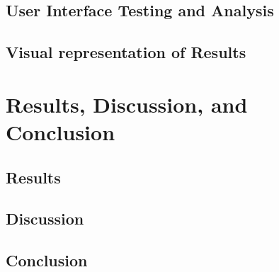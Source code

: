 \documentclass[doc,apacite,12pt]{apa6}
\begin{document}
\clearpage

\subsection{User Interface Testing and Analysis}


\subsection{Visual representation of Results}


\clearpage

\section{Results, Discussion, and Conclusion}

\subsection{Results}


\subsection{Discussion}


\subsection{Conclusion}


% 



% 
\end{document}
